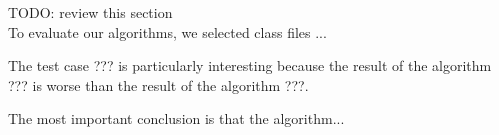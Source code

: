 TODO: review this section
\\

To evaluate our  algorithms, we selected class files ...

The test case ???  is particularly interesting 
because the result of the algorithm ??? is worse 
than the result of the algorithm ???.

The most important conclusion is that the algorithm...

